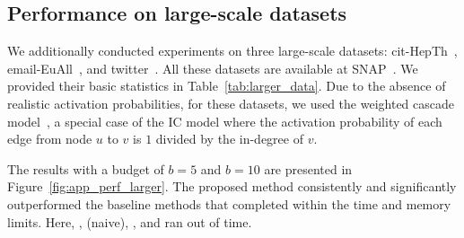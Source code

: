 \subsection{Performance on large-scale datasets}\label{sec:larger_dataset}

We additionally conducted experiments on three large-scale datasets: cit-HepTh~\citep{leskovec2005graphs, gehrke2003overview}, email-EuAll~\citep{leskovec2007graph}, and twitter~\citep{leskovec2012learning}. All these datasets are available at SNAP~\citep{snapnets}. We provided their basic statistics in Table~\ref{tab:larger_data}.
Due to the absence of realistic activation probabilities, for these datasets, we used the weighted cascade model~\citep{kempe2003maximizing}, a special case of the IC model where the activation probability of each edge from node $u$ to $v$ is $1$ divided by the in-degree of $v$.

The results with a budget of $b=5$ and $b=10$ are presented in Figure~\ref{fig:app_perf_larger}. The proposed method consistently and significantly outperformed the baseline methods that completed within the time and memory limits. Here, \BPM, \naive(naive), \RIS, and  ran out of time.












\FloatBarrier







